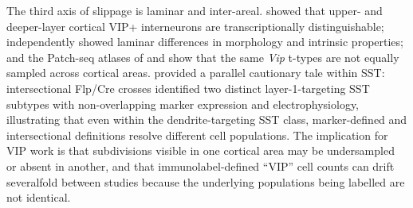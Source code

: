 \documentclass[11pt]{article}
\begin{document}
The third axis of slippage is laminar and inter-areal. \citet{Wu2022} showed that upper- and deeper-layer cortical VIP+ interneurons are transcriptionally distinguishable; \citet{Pronneke2015} independently showed laminar differences in morphology and intrinsic properties; and the Patch-seq atlases of \citet{Gouwens2020a} and \citet{Scala2021} show that the same \textit{Vip} t-types are not equally sampled across cortical areas. \citet{Hostetler2023} provided a parallel cautionary tale within SST: intersectional Flp/Cre crosses identified two distinct layer-1-targeting SST subtypes with non-overlapping marker expression and electrophysiology, illustrating that even within the dendrite-targeting SST class, marker-defined and intersectional definitions resolve different cell populations. The implication for VIP work is that subdivisions visible in one cortical area may be undersampled or absent in another, and that immunolabel-defined ``VIP'' cell counts can drift severalfold between studies because the underlying populations being labelled are not identical.
\end{document}
